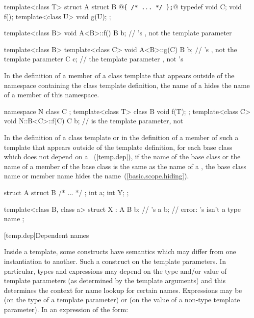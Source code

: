 \begin{codeblock}
template<class T> struct A {
  struct B @\texttt{\{ /* ... */ \};}@
  typedef void C;
  void f();
  template<class U> void g(U);
};

template<class B> void A<B>::f() {
  B b;              // 's , not the template parameter
}

template<class B> template<class C> void A<B>::g(C) {
  B b;              // 's , not the template parameter
  C c;              // the template parameter , not 's 
}
\end{codeblock}
\exitexample

\pnum
In the definition of a member of a class template that appears outside of the
namespace containing the class template definition,
the name of a
hides the name of a member of this namespace.
\enterexample

\begin{codeblock}
namespace N {
  class C { };
  template<class T> class B {
    void f(T);
  };
}
template<class C> void N::B<C>::f(C) {
  C b;              //  is the template parameter, not 
}
\end{codeblock}
\exitexample

\pnum
In the definition of a class template or in the definition of a member of such
a template that appears outside of the template definition,
for each base class which does not depend on a
~(\ref{temp.dep}), if the name of the base class
or the name of a member of the
base class is the same as the name of a
,
the base class name or member name hides the
name~(\ref{basic.scope.hiding}).
\enterexample

\begin{codeblock}
struct A {
  struct B { /* ... */ };
  int a;
  int Y;
};

template<class B, class a> struct X : A {
  B b;              // 's 
  a b;              // error: 's  isn't a type name
};
\end{codeblock}
\exitexample

[temp.dep]{Dependent names}

\pnum
{}%
Inside a template, some constructs have semantics which may differ from one
instantiation to another.
Such a construct
on the template parameters.
In particular, types and expressions may depend on the type
and/or
value of
template parameters (as determined by the template arguments) and this determines
the context for name lookup for certain names.
Expressions may be
(on the type of a template parameter) or
(on the value of a non-type template parameter).
In an expression of the form:

